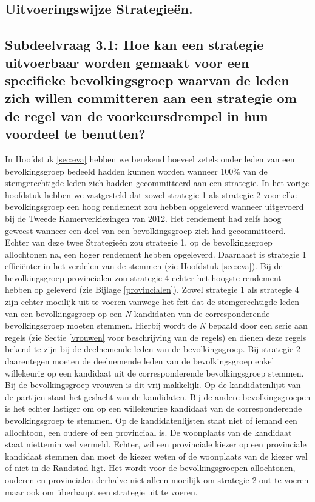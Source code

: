 \subsection{Uitvoeringswijze Strategie\"{e}n.}

\subsection*{Subdeelvraag 3.1: Hoe kan een strategie uitvoerbaar worden gemaakt voor een specifieke bevolkingsgroep waarvan de leden zich willen committeren aan een strategie om de regel van de voorkeursdrempel in hun voordeel te benutten?}
In Hoofdstuk \ref{sec:eva} hebben we berekend hoeveel zetels onder leden van een bevolkingsgroep bedeeld hadden kunnen worden wanneer 100\% van de stemgerechtigde leden zich hadden gecommitteerd aan een strategie. In het vorige hoofdstuk hebben we vastgesteld dat zowel strategie 1 als strategie 2 voor elke bevolkingsgroep een hoog rendement zou hebben opgeleverd wanneer uitgevoerd bij de Tweede Kamerverkiezingen van 2012. Het rendement had zelfs hoog geweest wanneer een deel van een bevolkingsgroep zich had gecommitteerd. Echter van deze twee Strategie\"{e}n zou strategie 1, op de bevolkingsgroep allochtonen na, een hoger rendement hebben opgeleverd. Daarnaast is strategie 1 effici\"{e}nter in het verdelen van de stemmen (zie Hoofdstuk \ref{sec:eva}). Bij de bevolkingsgroep provincialen zou strategie 4 echter het hoogste rendement hebben op geleverd (zie Bijlage \ref{provincialen}). Zowel strategie 1 als strategie 4 zijn echter moeilijk uit te voeren vanwege het feit dat de stemgerechtigde leden van een bevolkingsgroep op een \textit{N} kandidaten van de corresponderende bevolkingsgroep moeten stemmen. Hierbij wordt de \textit{N} bepaald door een serie aan regels (zie Sectie \ref{vrouwen} voor beschrijving van de regels) en dienen deze regels bekend te zijn bij de deelnemende leden van de bevolkingsgroep. Bij strategie 2 daarentegen moeten de deelnemende leden van de bevolkingsgroep enkel willekeurig op een kandidaat uit de corresponderende bevolkingsgroep stemmen. Bij de bevolkingsgroep vrouwen is dit vrij makkelijk. Op de kandidatenlijst van de partijen staat het geslacht van de kandidaten. Bij de andere bevolkingsgroepen is het echter lastiger om op een willekeurige kandidaat van de corresponderende bevolkingsgroep te stemmen. Op de kandidatenlijsten staat niet of iemand een allochtoon, een oudere of een provinciaal is. De woonplaats van de kandidaat staat niettemin wel vermeld. Echter, wil een provinciale kiezer op een provinciale kandidaat stemmen dan moet de kiezer weten of de woonplaats van de kiezer wel of niet in de Randstad ligt. Het wordt voor de bevolkingsgroepen allochtonen, ouderen en provincialen derhalve niet alleen moeilijk om strategie 2 out te voeren maar ook om \"{u}berhaupt een strategie uit te voeren. 

